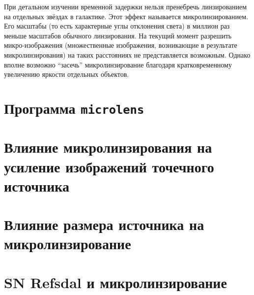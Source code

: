 При детальном изучении временной задержки нельзя пренебречь линзированием на отдельных звёздах в галактике. Этот эффект называется микролинзированием. Его масштабы (то есть характерные углы отклонения света) в миллион раз меньше масштабов обычного линзирования. На текущий момент разрешить микро-изображения (множественные изображения, возникающие в результате микролинзирования) на таких расстояниях не представляется возможным. Однако вполне возможно “засечь” микролинзирование благодаря кратковременному увеличению яркости отдельных объектов. 

\section{Программа \tt{microlens}}
    
    
\section{Влияние микролинзирования на усиление изображений точечного источника}
    
    
\section{Влияние размера источника на микролинзирование}
    
    
\section{SN Refsdal и микролинзирование}
    